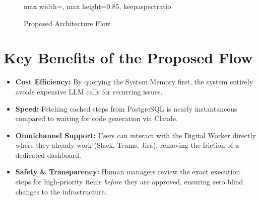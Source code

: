 \documentclass[12pt,a4paper]{article}
\begin{document}
\begin{figure}[htbp]
\begin{adjustbox}{max width=\textwidth, max height=0.85\textheight, keepaspectratio}
\end{adjustbox}
\caption{Proposed Architecture Flow}
\end{figure}

\newpage
\section{Key Benefits of the Proposed Flow}
\begin{itemize}
    \item \textbf{Cost Efficiency:} By querying the System Memory first, the system entirely avoids expensive LLM calls for recurring issues.
    \item \textbf{Speed:} Fetching cached steps from PostgreSQL is nearly instantaneous compared to waiting for code generation via Claude.
    \item \textbf{Omnichannel Support:} Users can interact with the Digital Worker directly where they already work (Slack, Teams, Jira), removing the friction of a dedicated dashboard.
    \item \textbf{Safety \& Transparency:} Human managers review the exact execution steps for high-priority items \textit{before} they are approved, ensuring zero blind changes to the infrastructure.
\end{itemize}
\end{document}
